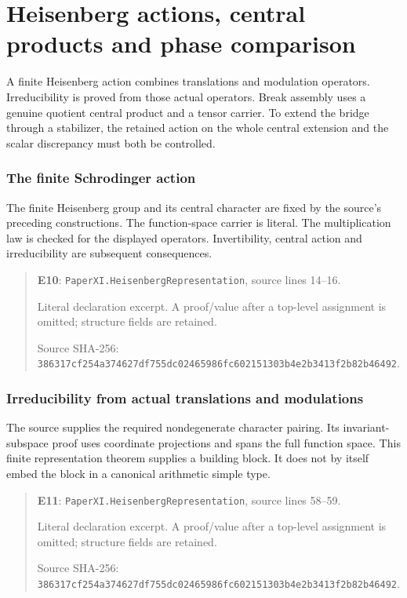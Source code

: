\documentclass[10pt,oneside]{book}
\begin{document}
\chapter{Heisenberg actions, central products and phase comparison}
A finite Heisenberg action combines translations and modulation operators. Irreducibility is proved from those actual operators. Break assembly uses a genuine quotient central product and a tensor carrier. To extend the bridge through a stabilizer, the retained action on the whole central extension and the scalar discrepancy must both be controlled.

\subsection{The finite Schrodinger action}
\label{guide:E10}
The finite Heisenberg group and its central character are fixed by the source's preceding constructions. The function-space carrier is literal.
The multiplication law is checked for the displayed operators. Invertibility, central action and irreducibility are subsequent consequences.

\begin{quote}\footnotesize\textbf{E10}: \nolinkurl{PaperXI.HeisenbergRepresentation}, source lines 14--16.\par Literal declaration excerpt. A proof/value after a top-level assignment is omitted; structure fields are retained.\par Source SHA-256: {\scriptsize\texttt{386317cf254a374627df755dc02465986fc602151303b4e2b3413f2b82b46492}}.\end{quote}


\subsection{Irreducibility from actual translations and modulations}
\label{guide:E11}
The source supplies the required nondegenerate character pairing. Its invariant-subspace proof uses coordinate projections and spans the full function space.
This finite representation theorem supplies a building block. It does not by itself embed the block in a canonical arithmetic simple type.

\begin{quote}\footnotesize\textbf{E11}: \nolinkurl{PaperXI.HeisenbergRepresentation}, source lines 58--59.\par Literal declaration excerpt. A proof/value after a top-level assignment is omitted; structure fields are retained.\par Source SHA-256: {\scriptsize\texttt{386317cf254a374627df755dc02465986fc602151303b4e2b3413f2b82b46492}}.\end{quote}
\end{document}
